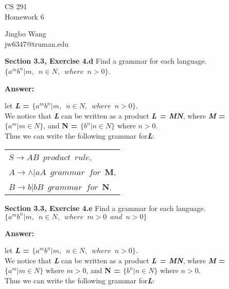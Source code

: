 \documentclass[12pt]{article}
\begin{document}
\begin{center}
{\large CS 291}\\
Homework 6
\end{center}

\begin{flushright}
Jingbo Wang\\
jw6347@truman.edu
\end{flushright}

\textbf{Section 3.3, Exercise 4.d} Find a grammar for each language.\\
$\{a^m b^n | m, \enspace n \in N, \enspace where \enspace n > 0\}$.

\textbf{Answer:}

let \textbf{\textit{L} = $\{a^m b^n | m, \enspace n \in N, 
\enspace where \enspace n > 0\}$}.\\
We notice that \textbf{\textit{L}} can be written as a product \textbf{\textit{L = MN}},
where \textbf{\textit{M} = $\{a^m | m \in N \}$},
and \textbf{N = $\{b^n | n \in N\}$} where $n > 0$.\\
Thus we can write the following grammar for\textbf{\textit{L}}:

\begin{center}
\begin{tabular}{l}
$S \rightarrow AB \enspace product \enspace rule$, \\
$A \rightarrow \wedge | aA \enspace grammar \enspace for \enspace \textbf{M}$,\\
$B \rightarrow b | bB \enspace grammar \enspace for \enspace \textbf{N}$. \\   
\end{tabular}
\end{center}
 
 
 
 

\textbf{Section 3.3, Exercise 4.e} Find a grammar for each language.\\
$\{a^m b^n | m, \enspace n \in N, 
\enspace where \enspace m > 0 \enspace and \enspace n > 0 \}$

\textbf{Answer:}

let \textbf{\textit{L} = $\{a^m b^n | m, \enspace n \in N, 
\enspace where \enspace n > 0\}$}.\\
We notice that \textbf{\textit{L}} can be written as a product \textbf{\textit{L = MN}},
where \textbf{\textit{M} = $\{a^m | m \in N \}$} where $m > 0$,
and \textbf{N = $\{b^n | n \in N\}$} where $n > 0$.\\
Thus we can write the following grammar for\textbf{\textit{L}}:
\end{document}
